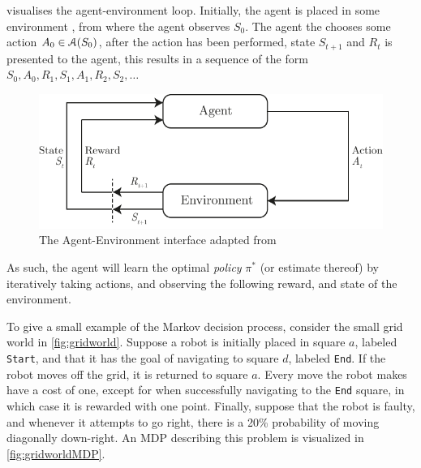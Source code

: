 
\vspace*{1em}

 visualises the agent-environment loop. 
Initially, the agent is placed in some environment , from where the agent observes $S_0$.
The agent the chooses some action $A_0 \in \mathcal{A}(S_0)$, after the action has been performed, state $S_{t+1}$ and $R_t$ is presented to the agent, this results in a sequence of the form $S_0,A_0,R_1,S_1,A_1,R_2,S_2,\ldots$

\begin{figure}[!htb]
    \centering
    \includegraphics[scale=1]{../include/agent-environment-loop.pdf}
    \caption{The Agent-Environment interface adapted from \citet[chap. 3]{RLBook2018}}
    \label{fig:agent-environment}
\end{figure}

As such, the agent will learn the optimal \textit{policy} $\pi^*$ (or estimate thereof) by iteratively taking actions, and observing the following reward, and state of the environment.

To give a small example of the Markov decision process, consider the small grid world in \cref{fig:gridworld}. 
Suppose a robot is initially placed in square $a$, labeled \texttt{Start}, and that it has the goal of navigating to square $d$, labeled \texttt{End}. 
If the robot moves off the grid, it is returned to square $a$. 
Every move the robot makes have a cost of one, except for when successfully navigating to the \texttt{End} square, in which case it is rewarded with one point. 
Finally, suppose that the robot is faulty, and whenever it attempts to go right, there is a 20\% probability of moving diagonally down-right.
An MDP describing this problem is visualized in \cref{fig:gridworldMDP}.

